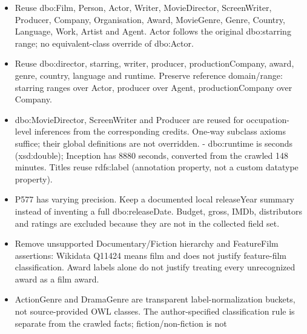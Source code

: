 \documentclass[
  11pt,
]{article}
\providecommand{\tightlist}{%
  \setlength{\itemsep}{0pt}\setlength{\parskip}{0pt}}
\begin{document}
\begin{itemize}
\tightlist
\item
  Reuse dbo:Film, Person, Actor, Writer,
  Movie\allowbreak{}Dir\allowbreak{}ector,
  Screen\allowbreak{}Wr\allowbreak{}iter, Producer, Company,
  Organisa\allowbreak{}tion, Award, MovieGenre, Genre, Country,
  Language, Work, Artist and Agent. Actor follows the original
  dbo:starring range; no
  equivale\allowbreak{}nt-\allowbreak{}class\allowbreak{} override of
  dbo:Actor.
\item
  Reuse dbo:\allowbreak{}dire\allowbreak{}ctor, starring, writer,
  producer, producti\allowbreak{}on\allowbreak{}Compan\allowbreak{}y,
  award, genre, country, language and runtime. Preserve reference
  domain/\allowbreak{}r\allowbreak{}ange:\allowbreak{} starring ranges
  over Actor, producer over Agent,
  producti\allowbreak{}on\allowbreak{}Compan\allowbreak{}y over Company.
\item
  dbo:\allowbreak{}\allowbreak{}Movi\allowbreak{}e\allowbreak{}Directo\allowbreak{}r,
  ScreenWriter and Producer are reused for
  occupati\allowbreak{}on-\allowbreak{}level\allowbreak{} inferences
  from the correspo\allowbreak{}nding credits. One-way subclass axioms
  suffice; their global definitions are not overridden. - dbo:runtime is
  seconds (xsd:\allowbreak{}dou\allowbreak{}ble); Inception has 8880
  seconds, converted from the crawled 148 minutes. Titles reuse
  rdfs:label (annotation property, not a custom datatype property).
\item
  P577 has varying precision. Keep a documented local releaseYear
  summary instead of inventing a full
  dbo:\allowbreak{}rele\allowbreak{}ase\allowbreak{}Date.\allowbreak{}
  Budget, gross, IMDb, distributors and ratings are excluded because
  they are not in the collected field set.
\item
  Remove unsupported
  Document\allowbreak{}ary/\allowbreak{}\allowbreak{}Fict\allowbreak{}ion
  hierarchy and FeatureFilm assertions: Wikidata Q11424 means film and
  does not justify feature-film
  classifi\allowbreak{}cation.\allowbreak{} Award labels alone do not
  justify treating every unrecognized award as a film award.
\item
  ActionGenre and DramaGenre are transparent
  label-\allowbreak{}no\allowbreak{}rmalizat\allowbreak{}ion buckets,
  not source-\allowbreak{}p\allowbreak{}rovided OWL classes. The
  author-\allowbreak{}s\allowbreak{}pecified\allowbreak{}
  classifi\allowbreak{}cation rule is separate from the crawled facts;
  fiction/\allowbreak{}non-\allowbreak{}fict\allowbreak{}ion is not

\end{itemize}
\end{document}
